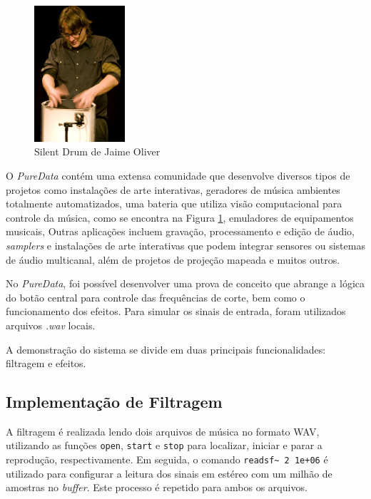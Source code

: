 \begin{figure}[h]
    \centering
    \includegraphics[width=0.3\textwidth]{figuras/fig79.jpg}
    \caption{Silent Drum de Jaime Oliver}
    \label{fig78}
\end{figure}

O \textit{PureData} contém uma extensa comunidade que desenvolve diversos tipos de projetos como instalações de arte interativas, geradores de música ambientes totalmente automatizados, uma bateria que utiliza visão computacional para controle da música, como se encontra na Figura \ref{fig78}, emuladores de equipamentos musicais, 
Outras aplicações incluem gravação, processamento e edição de áudio, \textit{samplers} e instalações de arte interativas que podem integrar sensores ou sistemas de áudio multicanal, além de projetos de projeção mapeada e muitos outros.

No \textit{PureData}, foi possível desenvolver uma prova de conceito que abrange a lógica do botão central para controle das frequências de corte, bem como o funcionamento dos efeitos. Para simular os sinais de entrada, foram utilizados arquivos \textit{.wav} locais.

A demonstração do sistema se divide em duas principais funcionalidades: filtragem e efeitos.

\subsection{Implementação de Filtragem}

A filtragem é realizada lendo dois arquivos de música no formato WAV, utilizando as funções \texttt{open}, \texttt{start} e \texttt{stop} para localizar, iniciar e parar a reprodução, respectivamente. Em seguida, o comando \texttt{readsf\textasciitilde\ 2 1e+06} é utilizado para configurar a leitura dos sinais em estéreo com um milhão de amostras no \textit{buffer}. Este processo é repetido para ambos os arquivos.

